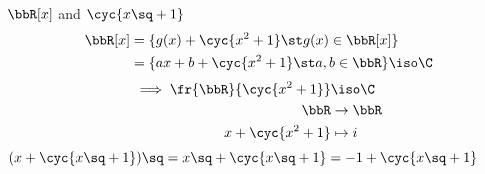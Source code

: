 \begin{example}
  \( \bbR[x] \) and \( \cyc{x\sq+1} \)
  \begin{align*}
    \bbR[x] &= \{ g(x) + \cyc{x^2+1} \st g(x)\in \bbR[x] \} \\
          &= \{ ax+b + \cyc{x^2+1} \st a,b\in \bbR \} \iso \C
  \end{align*}
  \begin{align*}
    \implies \fr{\bbR}{\cyc{x^2+1}}&\iso\C \\
    \bbR &\to \bbR \\
    x+\cyc{x^2+1} &\mapsto i
  \end{align*}
  \( (x+\cyc{x\sq +1})\sq = x\sq + \cyc{x\sq+1} = -1+\cyc{x\sq+1} \)
\end{example}